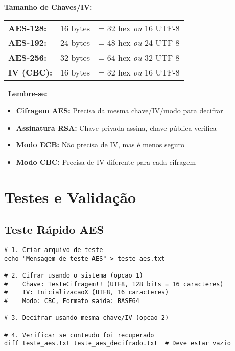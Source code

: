 \documentclass[12pt,a4paper]{article}
\begin{document}
\begin{successbox}
\textbf{Tamanho de Chaves/IV:}\\[0.5em]
\begin{tabular}{lll}
\textbf{AES-128:} & 16 bytes & = 32 hex \textit{ou} 16 UTF-8 \\
\textbf{AES-192:} & 24 bytes & = 48 hex \textit{ou} 24 UTF-8 \\
\textbf{AES-256:} & 32 bytes & = 64 hex \textit{ou} 32 UTF-8 \\
\textbf{IV (CBC):} & 16 bytes & = 32 hex \textit{ou} 16 UTF-8 \\
\end{tabular}
\end{successbox}

\begin{warningbox}
\textbf{\faExclamationTriangle\ Lembre-se:}
\begin{itemize}
    \item \textbf{Cifragem AES:} Precisa da mesma chave/IV/modo para decifrar
    \item \textbf{Assinatura RSA:} Chave privada assina, chave pública verifica
    \item \textbf{Modo ECB:} Não precisa de IV, mas é menos seguro
    \item \textbf{Modo CBC:} Precisa de IV diferente para cada cifragem
\end{itemize}
\end{warningbox}

\section{Testes e Validação}

\subsection{Teste Rápido AES}

\begin{lstlisting}[style=bashstyle]
# 1. Criar arquivo de teste
echo "Mensagem de teste AES" > teste_aes.txt

# 2. Cifrar usando o sistema (opcao 1)
#    Chave: TesteCifragem!! (UTF8, 128 bits = 16 caracteres)
#    IV: InicializacaoX (UTF8, 16 caracteres)
#    Modo: CBC, Formato saida: BASE64

# 3. Decifrar usando mesma chave/IV (opcao 2)

# 4. Verificar se conteudo foi recuperado
diff teste_aes.txt teste_aes_decifrado.txt  # Deve estar vazio
\end{lstlisting}
\end{document}
